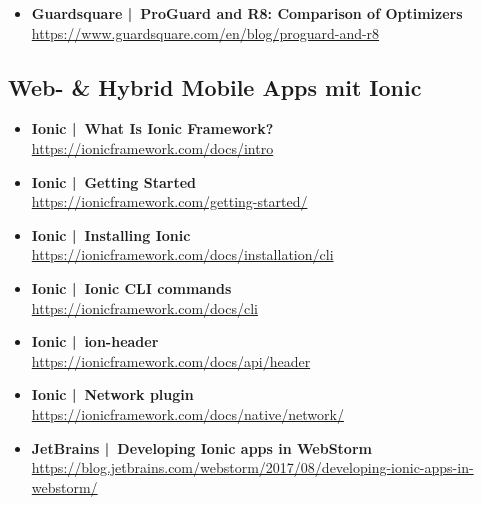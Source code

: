 \documentclass[a4paper]{article}
\begin{document}
{\begin{itemize}
		\item \textbf{Guardsquare | ProGuard and R8: Comparison of Optimizers}\\
		\href{https://www.guardsquare.com/en/blog/proguard-and-r8}
		{https://www.guardsquare.com/en/blog/proguard-and-r8}
		
	\end{itemize}

	\newpage

	\subsection{Web- \& Hybrid Mobile Apps mit Ionic}
	
	\begin{itemize}
		
		\item \textbf{Ionic | What Is Ionic Framework?}\\
		\href{https://ionicframework.com/docs/intro}
		{https://ionicframework.com/docs/intro}
		
		\item \textbf{Ionic | Getting Started}\\
		\href{https://ionicframework.com/getting-started/}
		{https://ionicframework.com/getting-started/}
				
		\item \textbf{Ionic | Installing Ionic}\\
		\href{https://ionicframework.com/docs/installation/cli}
		{https://ionicframework.com/docs/installation/cli}
		
		\item \textbf{Ionic | Ionic CLI commands}\\
		\href{https://ionicframework.com/docs/cli}
		{https://ionicframework.com/docs/cli}
				
		\item \textbf{Ionic | ion-header}\\
		\href{https://ionicframework.com/docs/api/header}
		{https://ionicframework.com/docs/api/header}
				
		\item \textbf{Ionic | Network plugin}\\
		\href{https://ionicframework.com/docs/native/network/}
		{https://ionicframework.com/docs/native/network/}
		
		\item \textbf{JetBrains | Developing Ionic apps in WebStorm}\\
		\href{https://blog.jetbrains.com/webstorm/2017/08/developing-ionic-apps-in-webstorm/}
		{https://blog.jetbrains.com/webstorm/2017/08/developing-ionic-apps-in-webstorm/}
		

\end{itemize}}
\end{document}
